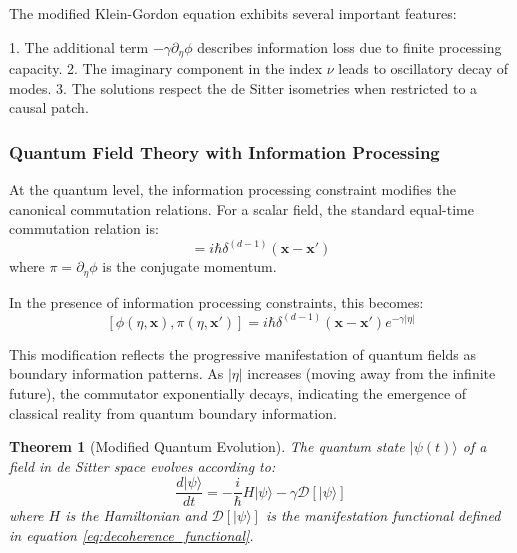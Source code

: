 \documentclass[11pt,english,twoside]{article}
\theoremstyle{plain}
\newtheorem{theorem}{Theorem}[section]
\theoremstyle{definition}
\theoremstyle{remark}
\newcommand{\D}{{\mathcal{D}}}
\newcommand{\gammaR}{\gamma}
\newcommand{\xb}{\mathbf{x}}
\begin{document}
The modified Klein-Gordon equation exhibits several important features:

1. The additional term $-\gammaR \partial_\eta\phi$ describes information loss due to finite processing capacity.
2. The imaginary component in the index $\nu$ leads to oscillatory decay of modes.
3. The solutions respect the de Sitter isometries when restricted to a causal patch.

\subsubsection{Quantum Field Theory with Information Processing}

At the quantum level, the information processing constraint modifies the canonical commutation relations. For a scalar field, the standard equal-time commutation relation is:
\begin{equation}
[\phi(\eta,\xb), \pi(\eta,\xb')] = i\hbar\delta^{(d-1)}(\xb-\xb')
\end{equation}
where $\pi = \partial_\eta\phi$ is the conjugate momentum.

In the presence of information processing constraints, this becomes:
\begin{equation}
\label{eq:modified_commutation}
[\phi(\eta,\xb), \pi(\eta,\xb')] = i\hbar\delta^{(d-1)}(\xb-\xb')e^{-\gammaR |\eta|}
\end{equation}

This modification reflects the progressive manifestation of quantum fields as boundary information patterns. As $|\eta|$ increases (moving away from the infinite future), the commutator exponentially decays, indicating the emergence of classical reality from quantum boundary information.

\begin{theorem}[Modified Quantum Evolution]
\label{thm:quantum_evolution}
The quantum state $|\psi(t)\rangle$ of a field in de Sitter space evolves according to:
\begin{equation}
\frac{d|\psi\rangle}{dt} = -\frac{i}{\hbar}H|\psi\rangle - \gammaR \D[|\psi\rangle]
\end{equation}
where $H$ is the Hamiltonian and $\D[|\psi\rangle]$ is the manifestation functional defined in equation \eqref{eq:decoherence_functional}.
\end{theorem}
\end{document}
